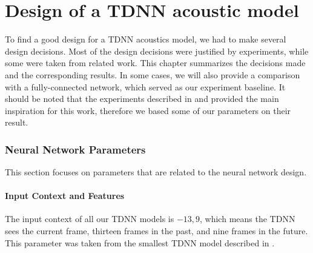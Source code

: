 


\chapter{Design of a TDNN acoustic model}
To find a good design for a TDNN acoustics model, we had to make several design decisions. Most of the design decisions were justified by experiments, while some were taken from related work. This chapter summarizes the decisions made and the corresponding results. In some cases, we will also provide a comparison with a fully-connected network, which served as our experiment baseline. It should be noted that the experiments described in \cite{peddinti2015jhu} and \cite{peddinti2015reverberation} provided the main inspiration for this work, therefore we based some of our parameters on their result. 

\subsection{Neural Network Parameters}
This section focuses on parameters that are related to the neural network design. 
\subsubsection{Input Context and Features}
The input context of all our TDNN models is ${-13,9}$, which means the TDNN sees the current frame, thirteen frames in the past, and nine frames in the future. This parameter was taken from the smallest TDNN model described in \cite{peddinti2015reverberation}. 
